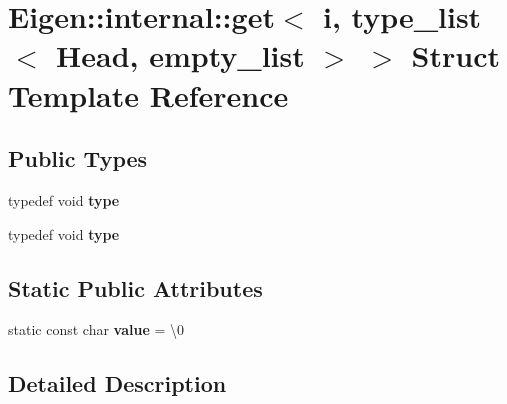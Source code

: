 \hypertarget{struct_eigen_1_1internal_1_1get_3_01i_00_01type__list_3_01_head_00_01empty__list_01_4_01_4}{}\section{Eigen\+:\+:internal\+:\+:get$<$ i, type\+\_\+list$<$ Head, empty\+\_\+list $>$ $>$ Struct Template Reference}
\label{struct_eigen_1_1internal_1_1get_3_01i_00_01type__list_3_01_head_00_01empty__list_01_4_01_4}
\subsection*{Public Types}
\begin{DoxyCompactItemize}
\item 
\mbox{\label{struct_eigen_1_1internal_1_1get_3_01i_00_01type__list_3_01_head_00_01empty__list_01_4_01_4_a1ed0c40a00cb3c2220ae319b2bc232f7}} 
typedef void {\bfseries type}
\item 
\mbox{\label{struct_eigen_1_1internal_1_1get_3_01i_00_01type__list_3_01_head_00_01empty__list_01_4_01_4_a1ed0c40a00cb3c2220ae319b2bc232f7}} 
typedef void {\bfseries type}
\end{DoxyCompactItemize}
\subsection*{Static Public Attributes}
\begin{DoxyCompactItemize}
\item 
\mbox{\label{struct_eigen_1_1internal_1_1get_3_01i_00_01type__list_3_01_head_00_01empty__list_01_4_01_4_ae371b9b43719356ac9757bb083c0184a}} 
static const char {\bfseries value} = \textquotesingle{}\textbackslash{}0\textquotesingle{}
\end{DoxyCompactItemize}


\subsection{Detailed Description}
